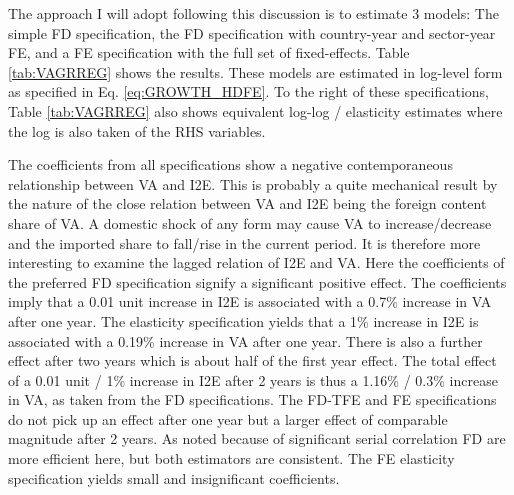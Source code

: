\documentclass[a4paper]{article}
\begin{document}
The approach I will adopt following this discussion is to estimate 3 models: The simple FD specification, the FD specification with country-year and sector-year FE, and a FE specification with the full set of fixed-effects. Table \ref{tab:VAGRREG} shows the results. %
These models are estimated in log-level form as specified in Eq. \ref{eq:GROWTH_HDFE}. To the right of these specifications, Table  \ref{tab:VAGRREG} also shows equivalent log-log / elasticity estimates where the log is also taken of the RHS variables. \newline 

The coefficients from all specifications show a negative contemporaneous relationship between VA and I2E. This is probably a quite mechanical result by the nature of the close relation between VA and I2E being the foreign content share of VA. A domestic shock of any form may cause VA to increase/decrease and the imported share to fall/rise in the current period. It is therefore more interesting to examine the lagged relation of I2E and VA. Here the coefficients of the preferred FD specification signify a significant positive effect. The coefficients imply that a 0.01 unit increase in I2E is associated with a 0.7\% increase in VA after one year. The elasticity specification yields that a 1\% increase in I2E is associated with a 0.19\% increase in VA after one year. There is also a further effect after two years which is about half of the first year effect. The total effect of a 0.01 unit / 1\% increase in I2E after 2 years is thus a 1.16\% / 0.3\% increase in VA, as taken from the FD specifications. The FD-TFE and FE specifications do not pick up an effect after one year but a larger effect of comparable magnitude after 2 years. As noted because of significant serial correlation FD are more efficient here, but both estimators are consistent. The FE elasticity specification yields small and insignificant coefficients.    %
\end{document}
